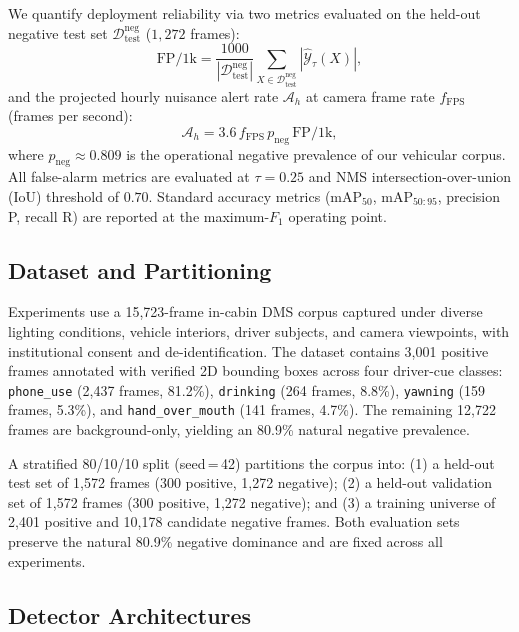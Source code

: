 \documentclass[conference]{IEEEtran}
\begin{document}
We quantify deployment reliability via two metrics evaluated on the
held-out negative test set $\mathcal{D}_{\mathrm{test}}^{\mathrm{neg}}$
($1{,}272$ frames):
\begin{equation}
\mathrm{FP/1k} = \frac{1000}{|\mathcal{D}_{\mathrm{test}}^{\mathrm{neg}}|}
  \sum_{X \in \mathcal{D}_{\mathrm{test}}^{\mathrm{neg}}}
  |\hat{\mathcal{Y}}_\tau(X)|,
\label{eq:fp1k}
\end{equation}
and the projected hourly nuisance alert rate $\mathcal{A}_h$ at
camera frame rate $f_{\mathrm{FPS}}$ (frames per second):
\begin{equation}
\mathcal{A}_h = 3.6\, f_{\mathrm{FPS}}\, p_{\mathrm{neg}}\,
  \mathrm{FP/1k},
\label{eq:nuisance}
\end{equation}
where $p_{\mathrm{neg}} \approx 0.809$ is the operational negative
prevalence of our vehicular corpus. All false-alarm metrics are
evaluated at $\tau = 0.25$ and NMS intersection-over-union (IoU)
threshold of $0.70$. Standard accuracy metrics
($\mathrm{mAP}_{50}$, $\mathrm{mAP}_{50:95}$, precision P, recall
R) are reported at the maximum-$F_1$ operating point.

\subsection{Dataset and Partitioning}
\label{subsec:dataset}

Experiments use a 15,723-frame in-cabin DMS corpus captured under
diverse lighting conditions, vehicle interiors, driver subjects, and
camera viewpoints, with institutional consent and de-identification.
The dataset contains 3,001 positive frames annotated with verified
2D bounding boxes across four driver-cue classes:
\texttt{phone\_use} (2,437 frames, 81.2\%),
\texttt{drinking} (264 frames, 8.8\%),
\texttt{yawning} (159 frames, 5.3\%), and
\texttt{hand\_over\_mouth} (141 frames, 4.7\%).
The remaining 12,722 frames are background-only, yielding an 80.9\%
natural negative prevalence.

A stratified 80/10/10 split (seed\,=\,42) partitions the corpus
into: (1) a held-out test set of 1,572 frames (300 positive,
1,272 negative); (2) a held-out validation set of 1,572 frames
(300 positive, 1,272 negative); and (3) a training universe of
2,401 positive and 10,178 candidate negative frames. Both
evaluation sets preserve the natural 80.9\% negative dominance
and are fixed across all experiments.

\subsection{Detector Architectures}
\label{subsec:architectures}
\end{document}
